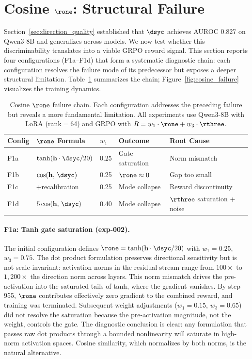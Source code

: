\section{Cosine \texorpdfstring{$\rone$}{R1}: Structural Failure}
\label{sec:cosine_failure}

Section~\ref{sec:direction_quality} established that $\dsyc$ achieves AUROC 0.827 on Qwen3-8B and generalizes across models.
We now test whether this discriminability translates into a viable GRPO reward signal.
This section reports four configurations (F1a--F1d) that form a systematic diagnostic chain: each configuration resolves the failure mode of its predecessor but exposes a deeper structural limitation.
Table~\ref{tab:cosine_chain} summarizes the chain; Figure~\ref{fig:cosine_failure} visualizes the training dynamics.

\begin{table}[t]
\centering
\caption{Cosine $\rone$ failure chain. Each configuration addresses the preceding failure but reveals a more fundamental limitation. All experiments use Qwen3-8B with LoRA (rank$=$64) and GRPO with $R = w_1 \cdot \rone + w_3 \cdot \rthree$.}
\label{tab:cosine_chain}
\begin{tabular}{lllll}
\toprule
Config & $\rone$ Formula & $w_1$ & Outcome & Root Cause \\
\midrule
F1a & $\tanh(\mathbf{h}\cdot\dsyc/20)$ & 0.25 & Gate saturation & Norm mismatch \\
F1b & $\cos(\mathbf{h},\, \dsyc)$ & 0.25 & $\rone \approx 0$ & Gap too small \\
F1c & +recalibration & 0.25 & Mode collapse & Reward discontinuity \\
F1d & $5\cos(\mathbf{h},\, \dsyc)$ & 0.40 & Mode collapse & $\rthree$ saturation + noise \\
\bottomrule
\end{tabular}
\end{table}

\paragraph{F1a: Tanh gate saturation (exp-002).}
The initial configuration defines $\rone = \tanh(\mathbf{h} \cdot \dsyc / 20)$ with $w_1{=}0.25$, $w_3{=}0.75$.
The dot product formulation preserves directional sensitivity but is not scale-invariant: activation norms in the residual stream range from $100{\times}$ to $1{,}200{\times}$ the direction norm across layers.
This norm mismatch drives the pre-activation into the saturated tails of tanh, where the gradient vanishes.
By step 955, $\rone$ contributes effectively zero gradient to the combined reward, and training was terminated.
Subsequent weight adjustments ($w_1{=}0.15$, $w_3{=}0.65$) did not resolve the saturation because the pre-activation magnitude, not the weight, controls the gate.
The diagnostic conclusion is clear: any formulation that passes raw dot products through a bounded nonlinearity will saturate in high-norm activation spaces.
Cosine similarity, which normalizes by both norms, is the natural alternative.

